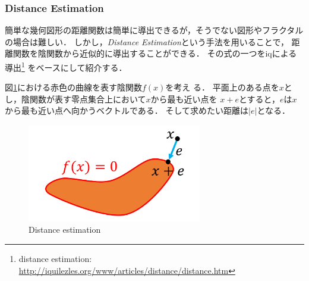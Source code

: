 \subsubsection{Distance Estimation}

簡単な幾何図形の距離関数は簡単に導出できるが，そうでない図形やフラクタル
の場合は難しい．
しかし，\textit{Distance Estimation}という手法を用いることで，
距離関数を陰関数から近似的に導出することができる．
その式の一つをiqによる導出\footnote{distance estimation:
\url{http://iquilezles.org/www/articles/distance/distance.htm}}
をベースにして紹介する．

図\ref{fig:distance-estimate}における赤色の曲線を表す陰関数$f(x)$を考え
る．
平面上のある点を$x$とし，陰関数が表す零点集合上において$x$から最も近い点を
$x + e$とすると，$e$は$x$から最も近い点へ向かうベクトルである．
そして求めたい距離は$|e|$となる．
 \begin{figure}[htbp]
  \center
  \includegraphics[width=3in, keepaspectratio]{../img/fractal/distance-estimate.pdf}
  \caption{Distance estimation}
  \label{fig:distance-estimate}
 \end{figure}

